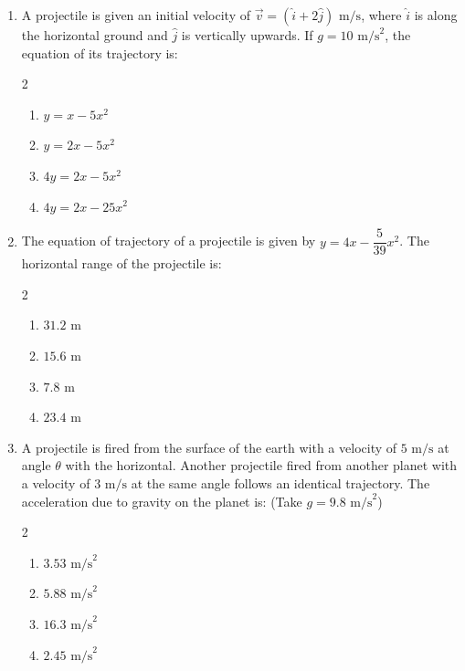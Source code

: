 \documentclass[11pt,a4paper]{article}
\begin{document}
\begin{enumerate}[label=\textbf{\textcolor{l1Green}{Q\arabic*.}},leftmargin=24pt,itemsep=10pt]
  \item A projectile is given an initial velocity of $\vec{v} = (\hat{i} + 2\hat{j})\text{ m/s}$, where $\hat{i}$ is along the horizontal ground and $\hat{j}$ is vertically upwards. If $g = 10\text{ m/s}^2$, the equation of its trajectory is:
  \begin{multicols}{2}
  \begin{enumerate}[label=\textbf{\textcolor{primaryDark}{(\Alph*)}},itemsep=2pt]
    \item $y = x - 5x^2$
    \item $y = 2x - 5x^2$
    \item $4y = 2x - 5x^2$
    \item $4y = 2x - 25x^2$
  \end{enumerate}
  \end{multicols}

  \item The equation of trajectory of a projectile is given by $y = 4x - \dfrac{5}{39}x^2$. The horizontal range of the projectile is:
  \begin{multicols}{2}
  \begin{enumerate}[label=\textbf{\textcolor{primaryDark}{(\Alph*)}},itemsep=2pt]
    \item $31.2\text{ m}$
    \item $15.6\text{ m}$
    \item $7.8\text{ m}$
    \item $23.4\text{ m}$
  \end{enumerate}
  \end{multicols}

  \item A projectile is fired from the surface of the earth with a velocity of $5\text{ m/s}$ at angle $\theta$ with the horizontal. Another projectile fired from another planet with a velocity of $3\text{ m/s}$ at the same angle follows an identical trajectory. The acceleration due to gravity on the planet is: (Take $g = 9.8\text{ m/s}^2$)
  \begin{multicols}{2}
  \begin{enumerate}[label=\textbf{\textcolor{primaryDark}{(\Alph*)}},itemsep=2pt]
    \item $3.53\text{ m/s}^2$
    \item $5.88\text{ m/s}^2$
    \item $16.3\text{ m/s}^2$
    \item $2.45\text{ m/s}^2$
  \end{enumerate}
  \end{multicols}


\end{enumerate}
\end{document}
